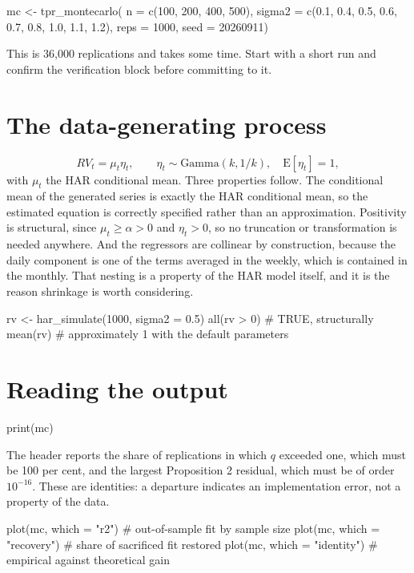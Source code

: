 \documentclass[11pt,a4paper]{report}
\begin{document}
\begin{Rblock}
mc <- tpr_montecarlo(
  n       = c(100, 200, 400, 500),
  sigma2  = c(0.1, 0.4, 0.5, 0.6, 0.7, 0.8, 1.0, 1.1, 1.2),
  reps    = 1000,
  seed    = 20260911)
\end{Rblock}

This is 36,000 replications and takes some time. Start with a short run
and confirm the verification block before committing to it.

\section{The data-generating process}

$$RV_t = \mu_t \eta_t, \qquad
\eta_t \sim \mathrm{Gamma}(k, 1/k), \quad \mathrm{E}[\eta_t] = 1,$$
with $\mu_t$ the HAR conditional mean. Three properties follow. The
conditional mean of the generated series is exactly the HAR conditional
mean, so the estimated equation is correctly specified rather than an
approximation. Positivity is structural, since $\mu_t \ge \alpha > 0$ and
$\eta_t > 0$, so no truncation or transformation is needed anywhere. And
the regressors are collinear by construction, because the daily component
is one of the terms averaged in the weekly, which is contained in the
monthly. That nesting is a property of the HAR model itself, and it is
the reason shrinkage is worth considering.

\begin{Rblock}
rv <- har_simulate(1000, sigma2 = 0.5)
all(rv > 0)              # TRUE, structurally
mean(rv)                 # approximately 1 with the default parameters
\end{Rblock}

\section{Reading the output}

\begin{Rblock}
print(mc)
\end{Rblock}

The header reports the share of replications in which $q$ exceeded one,
which must be 100 per cent, and the largest Proposition 2 residual, which
must be of order $10^{-16}$. These are identities: a departure indicates
an implementation error, not a property of the data.

\begin{Rblock}
plot(mc, which = "r2")         # out-of-sample fit by sample size
plot(mc, which = "recovery")   # share of sacrificed fit restored
plot(mc, which = "identity")   # empirical against theoretical gain
\end{Rblock}
\end{document}
